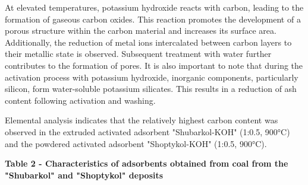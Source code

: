 
At elevated temperatures, potassium hydroxide reacts with carbon,
leading to the formation of gaseous carbon oxides. This reaction
promotes the development of a porous structure within the carbon
material and increases its surface area. Additionally, the reduction of
metal ions intercalated between carbon layers to their metallic state is
observed. Subsequent treatment with water further contributes to the
formation of pores. It is also important to note that during the
activation process with potassium hydroxide, inorganic components,
particularly silicon, form water-soluble potassium silicates. This
results in a reduction of ash content following activation and washing.

Elemental analysis indicates that the relatively highest carbon content
was observed in the extruded activated adsorbent "Shubarkol-KOH" (1:0.5,
900°C) and the powdered activated adsorbent "Shoptykol-KOH" (1:0.5,
900°C).

{\bfseries Table 2 - Characteristics of adsorbents obtained from coal from
the "Shubarkol" and "Shoptykol" deposits}


